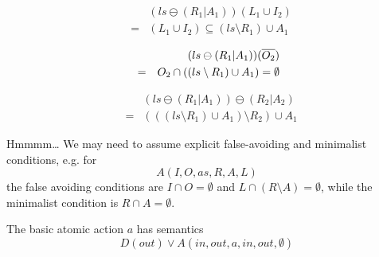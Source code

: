\begin{eqnarray*}
  && (ls\ominus(R_1|A_1))(L_1 \cup I_2)
\\&=& (L_1\cup I_2) \subseteq (ls \setminus R_1) \cup A_1
\end{eqnarray*}

\begin{eqnarray*}
  && (ls\ominus(R_1|A_1))(\overline{O_2})
\\&=& O_2 \cap ((ls \setminus R_1) \cup A_1) = \emptyset
\end{eqnarray*}

\begin{eqnarray*}
  && (ls\ominus(R_1|A_1))\ominus(R_2|A_2)
\\&=& (((ls \setminus R_1) \cup A_1) \setminus R_2) \cup A_1
\end{eqnarray*}

Hmmmm\dots  
We may need to assume explicit false-avoiding and minimalist conditions,
e.g. for
\[ 
   A(I,O,as,R,A,L) 
\]
the false avoiding conditions are
$I \cap O = \emptyset$ 
and $L \cap (R \setminus A) = \emptyset$,
while the minimalist condition is $R \cap A = \emptyset$.

The basic atomic action $a$ has semantics
\[
  D(out) \lor A(in,out,a,in,out,\emptyset)
\]


































